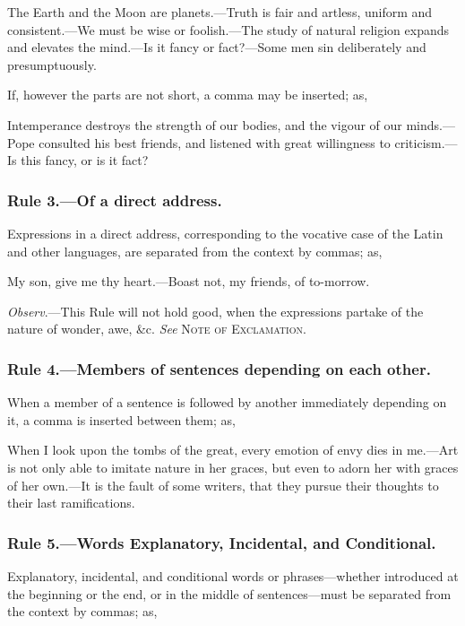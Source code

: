 \begin{example}
    The Earth and the Moon are planets.---Truth is fair and artless, uniform and
    consistent.---We must be wise or foolish.---The study of natural religion
    expands and elevates the mind.---Is it fancy or fact?---Some men sin
    deliberately and presumptuously.
\end{example}

If, however the parts are not short, a comma may be inserted; as,

\begin{example}
    Intemperance destroys the strength of our bodies, and the vigour of our
    minds.---Pope consulted his best friends, and listened with great
    willingness to criticism.---Is this fancy, or is it fact?
\end{example}

\subsubsection{Rule 3.---Of a direct address.}

Expressions in a direct address, corresponding to the vocative case of the Latin
and other languages, are separated from the context by commas; as,

\begin{example}
    My son, give me thy heart.---Boast not, my friends, of to-morrow.
\end{example}

\emph{Observ}.---This Rule will not hold good, when the expressions partake of
the nature of wonder, awe, \&c. \emph{See} \textsc{Note of Exclamation.}

\subsubsection{Rule 4.---Members of sentences depending on each other.}

When a member of a sentence is followed by another immediately depending on it,
a comma is inserted between them; as,

\begin{example}
    When I look upon the tombs of the great, every emotion of envy dies in
    me.---Art is not only able to imitate nature in her graces, but even to
    adorn her with graces of her own.---It is the fault of some writers, that
    they pursue their thoughts to their last ramifications.
\end{example}

\subsubsection{Rule 5.---Words Explanatory, Incidental, and Conditional.}

Explanatory, incidental, and conditional words or phrases---whether introduced
at the beginning or the end, or in the middle of sentences---must be separated
from the context by commas; as,
